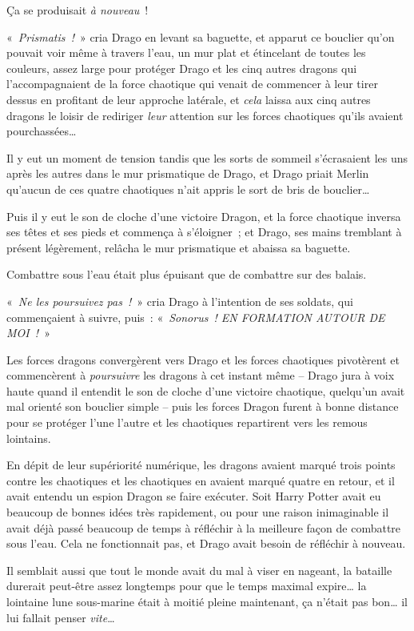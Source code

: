 Ça se produisait \emph{à nouveau}~!

«~\emph{Prismatis~!}~» cria Drago en levant sa baguette, et apparut ce bouclier qu'on pouvait voir même à travers l'eau, un mur plat et étincelant de toutes les couleurs, assez large pour protéger Drago et les cinq autres dragons qui l'accompagnaient de la force chaotique qui venait de commencer à leur tirer dessus en profitant de leur approche latérale, et \emph{cela} laissa aux cinq autres dragons le loisir de rediriger \emph{leur} attention sur les forces chaotiques qu'ils avaient pourchassées…

Il y eut un moment de tension tandis que les sorts de sommeil s'écrasaient les uns après les autres dans le mur prismatique de Drago, et Drago priait Merlin qu'aucun de ces quatre chaotiques n'ait appris le sort de bris de bouclier…

Puis il y eut le son de cloche d'une victoire Dragon, et la force chaotique inversa ses têtes et ses pieds et commença à s'éloigner~; et Drago, ses mains tremblant à présent légèrement, relâcha le mur prismatique et abaissa sa baguette.

Combattre sous l'eau était plus épuisant que de combattre sur des balais.

«~\emph{Ne les poursuivez pas~!}~» cria Drago à l'intention de ses soldats, qui commençaient à suivre, puis~: «~\emph{Sonorus~!
EN FORMATION AUTOUR DE MOI~!}~»

Les forces dragons convergèrent vers Drago et les forces chaotiques pivotèrent et commencèrent à \emph{poursuivre} les dragons à cet instant même -- Drago jura à voix haute quand il entendit le son de cloche d'une victoire chaotique, quelqu'un avait mal orienté son bouclier simple -- puis les forces Dragon furent à bonne distance pour se protéger l'une l'autre et les chaotiques repartirent vers les remous lointains.

En dépit de leur supériorité numérique, les dragons avaient marqué trois points contre les chaotiques et les chaotiques en avaient marqué quatre en retour, et il avait entendu un espion Dragon se faire exécuter.
Soit Harry Potter avait eu beaucoup de bonnes idées très rapidement, ou pour une raison inimaginable il avait déjà passé beaucoup de temps à réfléchir à la meilleure façon de combattre sous l'eau.
Cela ne fonctionnait pas, et Drago avait besoin de réfléchir à nouveau.

Il semblait aussi que tout le monde avait du mal à viser en nageant, la bataille durerait peut-être assez longtemps pour que le temps maximal expire… la lointaine lune sous-marine était à moitié pleine maintenant, ça n'était pas bon… il lui fallait penser \emph{vite}…

